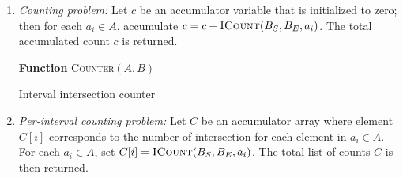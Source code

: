 \documentclass{bioinfo}
\begin{document}
        \begin{enumerate}


                \item
                {\em Counting problem:}  Let $c$ be an accumulator variable that is
                initialized to zero; then for each $a_i \in A$, accumulate $c = c +
                \textsc{ICount}(B_S,B_E,a_i)$.  The total accumulated count $c$ is 
                returned.
                \begin{algorithm}[h]
                        \DontPrintSemicolon
                        \footnotesize
                        \BlankLine
                        \textbf{Function} \textsc{Counter}$(A,B)$
                        \caption{Interval intersection counter}
                \end{algorithm}
                

                \item
                {\em Per-interval counting problem:} Let $C$ be an accumulator
                array where element $C[i]$ corresponds to the number of
                intersection for each element in $a_i\in A$.  For each $a_i \in A$,
                set $C[i]=\textsc{ICount}(B_S,B_E,a_i)$.  The total list of counts $C$ is then
                returned.
                

\end{enumerate}
\end{document}

